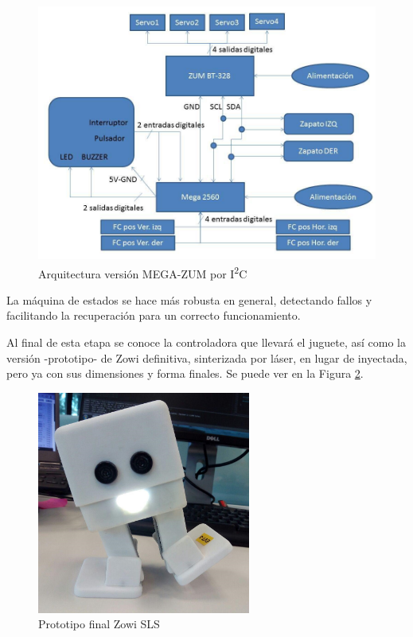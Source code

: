 \begin{figure}
\centering
\includegraphics[width=120mm]{Figures/v3-diag}
\caption[Arquitectura versión MEGA-ZUM por I\textsuperscript{2}C]{Arquitectura versión MEGA-ZUM por I\textsuperscript{2}C}
\label{fig:v3-diag}
\end{figure}

La máquina de estados se hace más robusta en general, detectando fallos y facilitando la recuperación para un correcto funcionamiento.

Al final de esta etapa se conoce la controladora que llevará el juguete, así como la versión -prototipo- de Zowi definitiva, sinterizada por láser, en lugar de inyectada, pero ya con sus dimensiones y forma finales. Se puede ver en la Figura \ref{fig:zowi-sls}.

\begin{figure}
\centering
\includegraphics[width=70mm]{Figures/zowi-sls}
\caption[Prototipo final Zowi SLS]{Prototipo final Zowi SLS}
\label{fig:zowi-sls}
\end{figure}

